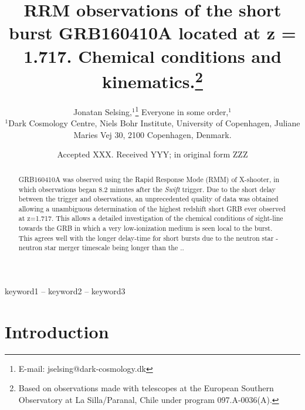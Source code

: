 \documentclass[a4paper,fleqn,usenatbib]{mnras}
\title[GRB160410A]{RRM observations of the short burst GRB160410A located at z = 1.717. Chemical conditions and kinematics.\thanks{Based on observations made with telescopes at the
	European Southern Observatory at La Silla/Paranal, Chile under
	program  097.A-0036(A).}}
\author[Selsing]{
Jonatan Selsing,$^{1}$\thanks{E-mail: jselsing@dark-cosmology.dk}
Everyone in some order,$^{1}$ \\
$^{1}$Dark Cosmology Centre, Niels Bohr Institute, University of Copenhagen, Juliane
Maries Vej 30, 2100 Copenhagen, Denmark.}
\date{Accepted XXX. Received YYY; in original form ZZZ}
\begin{document}
\label{firstpage}
\pagerange{\pageref{firstpage}--\pageref{lastpage}}
\maketitle

\begin{abstract}
GRB160410A was observed using the Rapid Response Mode (RMM) of X-shooter, in
which observations began 8.2 minutes after the \textit{Swift} trigger. Due to
the short delay between the trigger and observations, an unprecedented quality
of data was obtained allowing a unambiguous determination of the highest
redshift short GRB ever observed at z=1.717. This allows a detailed
investigation of the chemical conditions of sight-line towards the GRB in which
a very low-ionization medium is seen local to the burst. This agrees well with
the longer delay-time for short bursts due to the neutron star - neutron star
merger timescale being longer than the ..
\end{abstract}

\begin{keywords}
keyword1 -- keyword2 -- keyword3
\end{keywords}



\section{Introduction}
\end{document}
